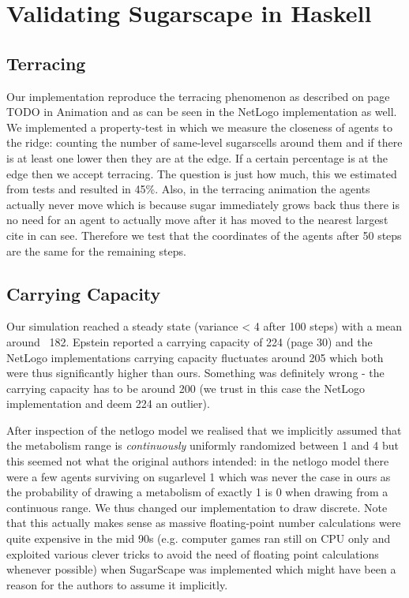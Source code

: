 \section{Validating Sugarscape in Haskell}
\subsection{Terracing}
Our implementation reproduce the terracing phenomenon as described on page TODO in Animation and as can be seen in the NetLogo implementation as well. We implemented a property-test in which we measure the closeness of agents to the ridge: counting the number of same-level sugarscells around them and if there is at least one lower then they are at the edge. If a certain percentage is at the edge then we accept terracing. The question is just how much, this we estimated from tests and resulted in 45\%. Also, in the terracing animation the agents actually never move which is because sugar immediately grows back thus there is no need for an agent to actually move after it has moved to the nearest largest cite in can see. Therefore we test that the coordinates of the agents after 50 steps are the same for the remaining steps.

\subsection{Carrying Capacity}
Our simulation reached a steady state (variance < 4 after 100 steps) with a mean around ~182. Epstein reported a carrying capacity of 224 (page 30) and the NetLogo implementations carrying capacity fluctuates around 205 which both were thus significantly higher than ours. Something was definitely wrong - the carrying capacity has to be around 200 (we trust in this case the NetLogo implementation and deem 224 an outlier).

After inspection of the netlogo model we realised that we implicitly assumed that the metabolism range is \textit{continuously} uniformly randomized between 1 and 4 but this seemed not what the original authors intended: in the netlogo model there were a few agents surviving on sugarlevel 1 which was never the case in ours as the probability of drawing a metabolism of exactly 1 is 0 when drawing from a continuous range. We thus changed our implementation to draw discrete. Note that this actually makes sense as massive floating-point number calculations were quite expensive in the mid 90s (e.g. computer games ran still on CPU only and exploited various  clever tricks to avoid the need of floating point calculations whenever possible) when SugarScape was implemented which might have been a reason for the authors to assume it implicitly.

